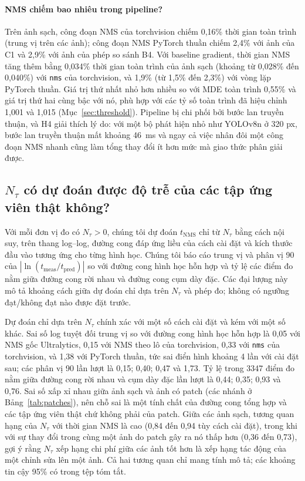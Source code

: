 \documentclass[a4paper,fleqn]{cas-dc}
\newcommand{\Ntau}{N_{\tau}}
\begin{document}
\paragraph{NMS chiếm bao nhiêu trong pipeline?}
Trên ảnh sạch, công đoạn NMS của torchvision chiếm 0,16\% thời gian toàn trình (trung vị trên các ảnh); công đoạn NMS PyTorch thuần chiếm 2,4\% với ảnh của C1 và 2,9\% với ảnh của phép so sánh B4. Với baseline gradient, thời gian NMS tăng thêm bằng 0,034\% thời gian toàn trình của ảnh sạch (khoảng từ 0,028\% đến 0,040\%) với \texttt{nms} của torchvision, và 1,9\% (từ 1,5\% đến 2,3\%) với vòng lặp PyTorch thuần. Giá trị thứ nhất nhỏ hơn nhiều so với MDE toàn trình 0,55\% và giá trị thứ hai cùng bậc với nó, phù hợp với các tỷ số toàn trình đã hiệu chỉnh 1,001 và 1,015 (Mục~\ref{sec:threshold}). Pipeline bị chi phối bởi bước lan truyền thuận, và H4 giải thích lý do: với một bộ phát hiện nhỏ như YOLOv8n ở 320 px, bước lan truyền thuận mất khoảng 46~ms và ngay cả việc nhân đôi một công đoạn NMS nhanh cũng làm tổng thay đổi ít hơn mức mà giao thức phân giải được.


\subsection{$\Ntau$ có dự đoán được độ trễ của các tập ứng viên thật không?}
Với mỗi đơn vị đo có $\Ntau>0$, chúng tôi dự đoán $t_{\mathrm{NMS}}$ chỉ từ $\Ntau$ bằng cách nội suy, trên thang log--log, đường cong đáp ứng liều của cách cài đặt và kích thước đầu vào tương ứng cho từng hình học. Chúng tôi báo cáo trung vị và phân vị 90 của $|\ln(t_{\mathrm{meas}}/t_{\mathrm{pred}})|$ so với đường cong hình học hỗn hợp và tỷ lệ các điểm đo nằm giữa đường cong rời nhau và đường cong cụm dày đặc. Các đại lượng này mô tả khoảng cách giữa dự đoán chỉ dựa trên $\Ntau$ và phép đo; không có ngưỡng đạt/không đạt nào được đặt trước.

Dự đoán chỉ dựa trên $\Ntau$ chính xác với một số cách cài đặt và kém với một số khác. Sai số log tuyệt đối trung vị so với đường cong hình học hỗn hợp là 0,05 với NMS gốc Ultralytics, 0,15 với NMS theo lô của torchvision, 0,33 với \texttt{nms} của torchvision, và 1,38 với PyTorch thuần, tức sai điển hình khoảng 4 lần với cài đặt sau; các phân vị 90 lần lượt là 0,15; 0,40; 0,47 và 1,73. Tỷ lệ trong 3347 điểm đo nằm giữa đường cong rời nhau và cụm dày đặc lần lượt là 0,44; 0,35; 0,93 và 0,76. Sai số xấp xỉ nhau giữa ảnh sạch và ảnh có patch (các nhánh ở Bảng~\ref{tab:patches}), nên chỗ sai là một tính chất của đường cong tổng hợp và các tập ứng viên thật chứ không phải của patch. Giữa các ảnh sạch, tương quan hạng của $\Ntau$ với thời gian NMS là cao (0,84 đến 0,94 tùy cách cài đặt), trong khi với sự thay đổi trong cùng một ảnh do patch gây ra nó thấp hơn (0,36 đến 0,73), gợi ý rằng $\Ntau$ xếp hạng chi phí giữa các ảnh tốt hơn là xếp hạng tác động của một chỉnh sửa lên một ảnh. Cả hai tương quan chỉ mang tính mô tả; các khoảng tin cậy 95\% có trong tệp tóm tắt.
\end{document}
